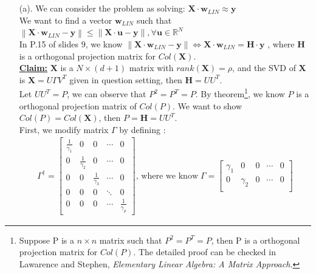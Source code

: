 \documentclass[a4paper,12pt]{article}
\begin{document}
\section{}
\begin{itemize}
 \item [(a).] We can consider the problem as solving: $\mathbf{X} \cdot \mathbf{w}_{LIN} \approx \mathbf{y}$ \\
 We want to find a vector $\mathbf{w}_{LIN}$ such that $\left \| \mathbf{X} \cdot \mathbf{w}_{LIN} - \mathbf{y} \right \| \leq \left \| \mathbf{X} \cdot \mathbf{u} - \mathbf{y} \right \| ,\forall \mathbf{u} \in \mathbb{R}^{N} $\\
 In P.15 of slides 9, we know $\left \| \mathbf{X} \cdot \mathbf{w}_{LIN} - \mathbf{y} \right \| \Leftrightarrow\mathbf{X} \cdot \mathbf{w}_{LIN}= \mathbf{H} \cdot \mathbf{y}$ , where $\mathbf{H}$ is a orthogonal projection matrix for $Col(\mathbf{X})$. \\
 \newline
 \textbf{\underline{Claim:}} $\mathbf{X}$ is a $N \times (d+1)$ matrix with $rank(\mathbf{X})=\rho$, and the SVD of $\mathbf{X}$ is $\mathbf{X}=U \Gamma V^{T}$ given in question setting, then $\mathbf{H}=U U^{T}$. \\
 Let $U U^{T}=P$, we can observe that $P^2=P^T=P$. By theorem\footnote{Suppose P is a $n \times n$ matrix such that $P^2=P^T=P$, then P is a orthogonal projection matrix for $Col(P)$. The detailed proof can be checked in Lawarence and Stephen, \textit{Elementary Linear Algebra: A Matrix Approach.}},
 we know $P$ is a orthogonal projection matrix of $Col(P)$. We want to show $Col(P)=Col(\mathbf{X})$, then $P=\mathbf{H}=U U^{T}$. \\
 First, we modify matrix $\Gamma$ by defining :
 \begin{align*}
 \Gamma^{\dagger}=\begin{bmatrix}
\frac{1}{\gamma_{1}} & 0 & 0 & \cdots & 0\\ 
 0 & \frac{1}{\gamma_{2}} & 0 & \cdots & 0\\ 
 0 & 0 & \frac{1}{\gamma_{3}} &  \cdots & 0 \\ 
 0 & 0 & 0 & \ddots & 0 \\ 
 0 & 0 & 0 & \cdots  & \frac{1}{\gamma_{\rho}}
\end{bmatrix} \text{, where we know} \; \Gamma=\begin{bmatrix}
\gamma_{1} & 0 & 0 & \cdots & 0\\ 
 0 & \gamma_{2} & 0 & \cdots & 0\\ 

\end{bmatrix}
\end{align*}
\end{itemize}
\end{document}

